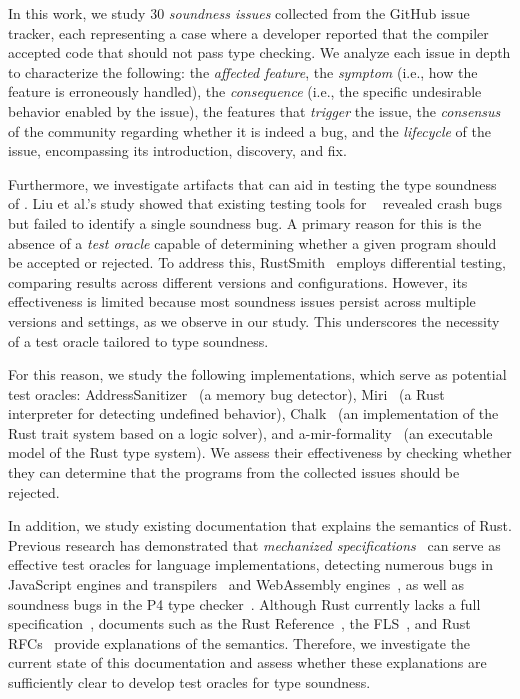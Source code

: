 In this work, we study 30 \emph{soundness issues} collected from the \rustc{}
GitHub issue tracker, each representing a case where a developer reported that
the compiler accepted code that should not pass type checking.
%
We analyze each issue in depth to characterize the following:
%
the \emph{affected feature},
%
the \emph{symptom} (i.e., how the feature is erroneously handled),
%
the \emph{consequence} (i.e., the specific undesirable behavior enabled by the
issue),
%
the features that \emph{trigger} the issue,
%
the \emph{consensus} of the community regarding whether it is indeed a bug,
%
and the \emph{lifecycle} of the issue, encompassing its introduction, discovery,
and fix.

Furthermore, we investigate artifacts that can aid in testing the type soundness
of \rustc{}.
%
Liu et al.'s study showed that existing testing tools for
\rustc{}~\cite{fuzz-rustc, tree-splicer, icemaker, sharma2023rustsmith,
yang2024rusttwins, wang2024rustlantis, dewey2015clp} revealed crash bugs but
failed to identify a single soundness bug.
%
A primary reason for this is the absence of a \emph{test oracle} capable of
determining whether a given program should be accepted or rejected.
%
To address this, RustSmith~\cite{sharma2023rustsmith} employs differential
testing, comparing results across different \rustc{} versions and
configurations.
%
However, its effectiveness is limited because most soundness issues persist
across multiple versions and settings, as we observe in our study.
%
This underscores the necessity of a test oracle tailored to type soundness.

For this reason, we study the following implementations, which serve as
potential test oracles:
%
AddressSanitizer~\cite{serebryany2012addresssanitizer} (a memory bug detector),
%
Miri~\cite{jung2026miri, gh-miri} (a Rust interpreter for detecting undefined
behavior),
%
Chalk~\cite{gh-chalk} (an implementation of the Rust trait system based on a
logic solver),
%
and a-mir-formality~\cite{gh-amirformality} (an executable model of the Rust
type system).
%
We assess their effectiveness by checking whether they can determine that the
programs from the collected issues should be rejected.

In addition, we study existing documentation that explains the semantics of
Rust.
%
Previous research has demonstrated that \emph{mechanized
specifications}~\cite{park2021jiset, youn2024bringing} can serve as effective
test oracles for language implementations,
%
detecting numerous bugs in JavaScript engines and
transpilers~\cite{park2021jest, park2023feature, ryu2024javascript} and
WebAssembly engines~\cite{youn2025west}, as well as soundness bugs in the P4
type checker~\cite{lee2026failing}.
%
Although Rust currently lacks a full specification~\cite{are-we-spec-yet},
documents such as the Rust Reference~\cite{rust-reference}, the FLS~\cite{fls},
and Rust RFCs~\cite{rust-rfcs} provide explanations of the semantics.
%
Therefore, we investigate the current state of this documentation and assess
whether these explanations are sufficiently clear to develop test oracles for
type soundness.

